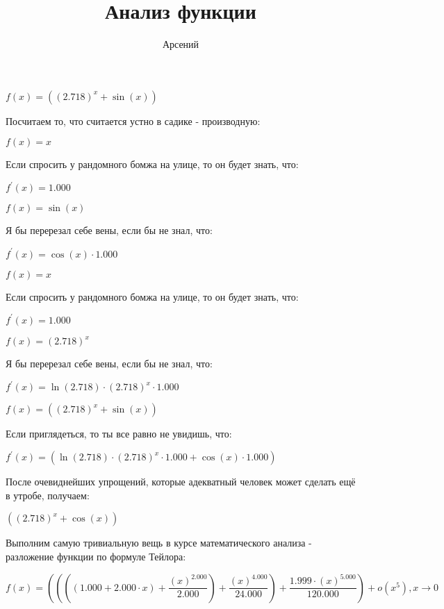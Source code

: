 \documentclass[a4paper,12pt]{article}
\author{\LARGEМерзляков Арсений}
\title{Анализ функции}
\begin{document}
\maketitle
\begin{flushleft}
\Large
$f(x) = ((2.718)^{x}+\sin {(x)})$

Посчитаем то, что считается устно в садике - производную:

$f(x) = x$

Если спросить у рандомного бомжа на улице, то он будет знать, что:

$f^{'}(x) = 1.000$

$f(x) = \sin {(x)}$

Я бы перерезал себе вены, если бы не знал, что:

$f^{'}(x) = \cos {(x)} \cdot 1.000$

$f(x) = x$

Если спросить у рандомного бомжа на улице, то он будет знать, что:

$f^{'}(x) = 1.000$

$f(x) = (2.718)^{x}$

Я бы перерезал себе вены, если бы не знал, что:

$f^{'}(x) = \ln {(2.718)} \cdot (2.718)^{x} \cdot 1.000$

$f(x) = ((2.718)^{x}+\sin {(x)})$

Если приглядеться, то ты все равно не увидишь, что:

$f^{'}(x) = (\ln {(2.718)} \cdot (2.718)^{x} \cdot 1.000+\cos {(x)} \cdot 1.000)$

После очевиднейших упрощений, которые адекватный человек может сделать ещё в утробе, получаем:

$((2.718)^{x}+\cos {(x)})$

Выполним самую тривиальную вещь в курсе математического анализа - разложение функции по формуле Тейлора: 

$f(x) = ((((1.000+2.000 \cdot x)+ \dfrac{(x)^{2.000}}{2.000} )+ \dfrac{(x)^{4.000}}{24.000} )+ \dfrac{1.999 \cdot (x)^{5.000}}{120.000} ) + o(x^{5}), x \rightarrow 0$

\end{flushleft}
\end{document}
